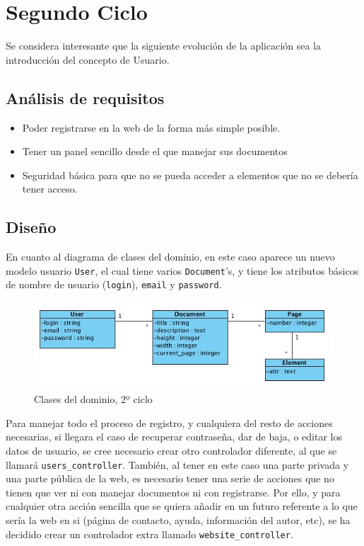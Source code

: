 \section{Segundo Ciclo} %
\label{sec:secundo_ciclo}

Se considera interesante que la siguiente evolución de la aplicación sea la introducción del concepto de Usuario.

\subsection{Análisis de requisitos} %
\label{sub:análisis_de_requisitos}

\begin{itemize}
  \item Poder registrarse en la web de la forma más simple posible.
  \item Tener un panel sencillo desde el que manejar sus documentos
  \item Seguridad básica para que no se pueda acceder a elementos que no se debería tener acceso.
\end{itemize}


\subsection{Diseño} %
\label{sub:diseño}

En cuanto al diagrama de clases del dominio, en este caso aparece un nuevo modelo usuario \texttt{User}, el cual tiene varios \texttt{Document}'s, y tiene los atributos básicos de nombre de usuario (\texttt{login}), \texttt{email} y \texttt{password}.

\begin{figure}[h!]
\centering
\includegraphics[width=15cm]{uml2.png}
\caption{Clases del dominio, 2º ciclo}\label{fig:uml2}
\end{figure}

Para manejar todo el proceso de registro, y cualquiera del resto de acciones necesarias, si llegara el caso de recuperar contraseña, dar de baja, o editar los datos de usuario, se cree necesario crear otro controlador diferente, al que se llamará \texttt{users\_controller}. También, al tener en este caso una parte privada y una parte pública de la web, es necesario tener una serie de acciones que no tienen que ver ni con manejar documentos ni con registrarse. Por ello, y para cualquier otra acción sencilla que se quiera añadir en un futuro referente a lo que sería la web en si (página de contacto, ayuda, información del autor, etc), se ha decidido crear un controlador extra llamado \texttt{website\_controller}.

